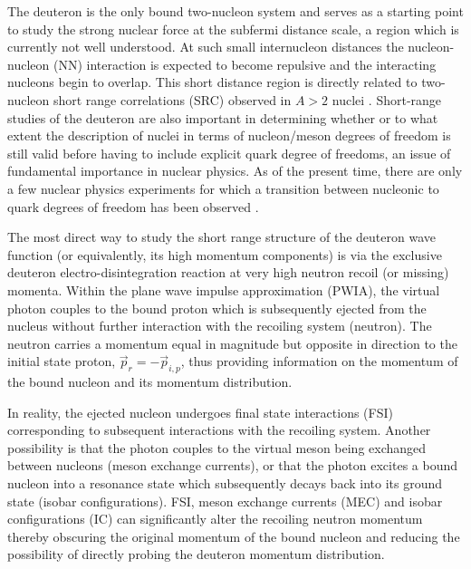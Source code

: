 The deuteron is the only bound two-nucleon  system and serves as a starting point to study the strong nuclear force at the subfermi distance scale, a region which is currently
not well understood. At such small internucleon distances the nucleon-nucleon (NN) interaction is expected to become repulsive and the interacting
nucleons begin to overlap. 
This short distance region is directly related to two-nucleon short range correlations (SRC) observed in $A>2$ nuclei \cite{PhysRevC.68.014313,PhysRevLett.96.082501,PhysRevLett.99.072501,Fomin_2017}.
Short-range studies of the deuteron are also important in determining whether or to what extent the description of nuclei in terms of nucleon/meson degrees of freedom is still valid before
having to include explicit quark degree of freedoms, an issue of fundamental importance in nuclear physics\cite{pr01-020}. As of the present time, there are only a few nuclear physics experiments for
which a transition between nucleonic to quark degrees of freedom has been observed \cite{PhysRevLett.81.4576,PhysRevLett.87.102302,PhysRevC.66.042201}.

The most direct way to study the short range structure of the deuteron wave function (or equivalently, its high momentum components) is via the exclusive deuteron
electro-disintegration reaction at very high neutron recoil (or missing) momenta. Within the plane wave impulse approximation (PWIA), the virtual photon couples to
the bound proton which is subsequently ejected from the nucleus without further interaction with the recoiling system (neutron). The neutron carries a momentum equal in magnitude but opposite in direction
to the initial state proton, $\vec{p}_{r} = -\vec{p}_{i,p}$, thus providing information on the momentum of the bound nucleon and its momentum distribution. 

In reality, the ejected nucleon undergoes final state interactions (FSI) corresponding to subsequent interactions with the recoiling system. Another possibility is that the
photon couples to the virtual meson being exchanged between nucleons (meson exchange currents), or that the photon excites a bound nucleon into a resonance state which subsequently
decays back into its ground state (isobar configurations).  FSI, meson exchange currents (MEC) and isobar configurations (IC)  can significantly alter the recoiling neutron
momentum thereby obscuring the original momentum of the bound nucleon and reducing the possibility of directly probing the deuteron momentum distribution.

